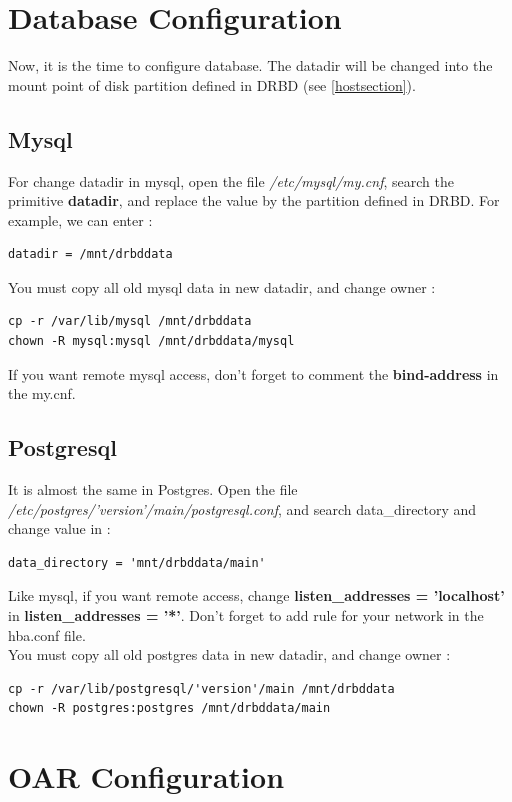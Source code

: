 \documentclass[a4paper,10pt]{report}
\begin{document}
\section{Database Configuration}
Now, it is the time to configure database. The datadir will be changed into the  mount point of disk partition defined in DRBD (see  \ref{hostsection}).

\subsection{Mysql}
For change datadir in mysql, open the file \textit{/etc/mysql/my.cnf}, search the primitive \textbf{datadir}, and replace the value by the partition defined in DRBD.
For example, we can enter :
\begin{lstlisting}
datadir = /mnt/drbddata
\end{lstlisting}
You must copy all old mysql data in new datadir, and change owner :
\begin{lstlisting}
cp -r /var/lib/mysql /mnt/drbddata
chown -R mysql:mysql /mnt/drbddata/mysql
\end{lstlisting}
If you want remote mysql access, don't forget to comment the \textbf{bind-address} in the my.cnf.

\subsection{Postgresql}
It is almost the same in Postgres. Open the file \textit{/etc/postgres/'version'/main/postgresql.conf}, and search data\_directory and change value in :
\begin{lstlisting}
data_directory = 'mnt/drbddata/main'
\end{lstlisting}
Like mysql, if you want remote access, change \textbf{listen\_addresses = 'localhost'} in \textbf{listen\_addresses = '*'}. Don't forget to add rule for your network in the hba.conf file.\\
You must copy all old postgres data in new datadir, and change owner :
\begin{lstlisting}
cp -r /var/lib/postgresql/'version'/main /mnt/drbddata
chown -R postgres:postgres /mnt/drbddata/main
\end{lstlisting}



\section{OAR Configuration}
\end{document}
